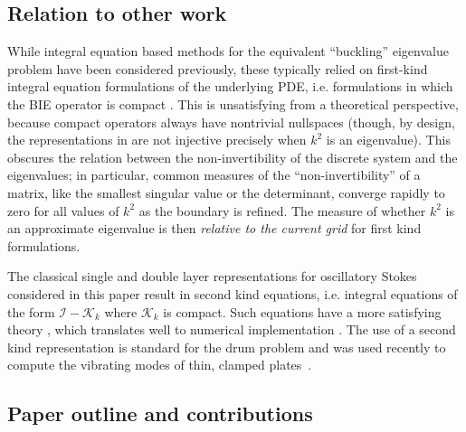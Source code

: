 \subsection{Relation to other work}

While integral equation based methods for the
equivalent \cite{kelliher2009eigenvalue}
``buckling'' eigenvalue problem
have been considered previously,
these typically relied on first-kind integral
equation formulations of the underlying PDE,
i.e. formulations in which the BIE operator is
compact \cite{kitahara2014boundary,antunes2011buckling}.
%
This is unsatisfying from a theoretical
perspective, because compact operators always
have nontrivial nullspaces
(though, by design, the representations in
\cite{kitahara2014boundary,antunes2011buckling}
are not injective precisely when
$k^2$ is an eigenvalue).
%
This obscures the relation between
the non-invertibility of the
discrete system and the eigenvalues;
in particular, common measures of the
``non-invertibility'' of a matrix, like the
smallest singular value or the determinant,
converge rapidly to zero for all values
of $k^2$ as the boundary is refined.
The measure of whether $k^2$ is an
approximate eigenvalue is then {\em relative to the
  current grid} for first kind formulations.

The classical single and double layer representations
for oscillatory Stokes considered in this paper
result in second kind equations, i.e. integral equations
of the form $\mathcal{I} - \mathcal{K}_k$ where
$\mathcal{K}_k$ is compact.
%
Such equations have a more satisfying theory
\cite{reed1972methods,colton1983integral,kress1989linear},
which translates well to numerical implementation
\cite{atkinson2009numerical,bornemann2010numerical,
  hackbusch2012integral,zhao2015robust}.
%
The use of a second kind representation is standard
for the drum problem \cite{backer2003numerical,zhao2015robust}
and was used recently to compute the vibrating
modes of thin, clamped plates~\cite{lindsay2018boundary}.

\subsection{Paper outline and contributions}

